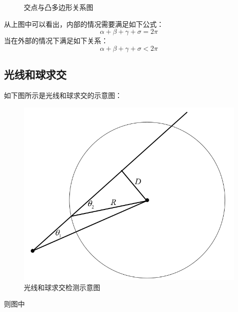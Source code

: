 \documentclass[10pt]{article}
\begin{document}
\begin{itemize}
\begin{figure}[H]
\begin{center}
\hspace{20pt}
\caption{交点与凸多边形关系图}
\end{center}
\end{figure}
\end{itemize}
从上图中可以看出，内部的情况需要满足如下公式：
$$\alpha+\beta+\gamma+\sigma=2\pi$$
当在外部的情况下满足如下关系：
$$\alpha+\beta+\gamma+\sigma < 2\pi$$

\subsection{光线和球求交}
如下图所示是光线和球求交的示意图：
\begin{figure}[H]
\begin{center}
\includegraphics[scale=0.4]{intersection_ray_sphere.png}
\caption{光线和球求交检测示意图}
\end{center}
\end{figure}
则图中
\end{document}
